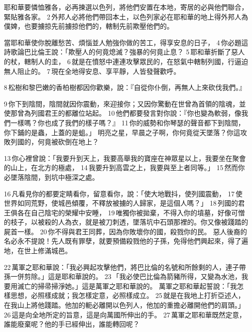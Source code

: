 耶和華要憐恤雅各，必再揀選以色列，將他們安置在本地，寄居的必與他們聯合，緊貼雅各家。 2 外邦人必將他們帶回本土，以色列家必在耶和華的地上得外邦人為僕婢，也要擄掠先前擄掠他們的，轄制先前欺壓他們的。

當耶和華使你脫離愁苦、煩惱並人勉強你做的苦工，得享安息的日子， 4 你必題這詩歌論巴比倫王說：「欺壓人的何竟熄滅？強暴的何竟止息？ 5 耶和華折斷了惡人的杖，轄制人的圭， 6 就是在憤怒中連連攻擊眾民的，在怒氣中轄制列國，行逼迫無人阻止的。 7 現在全地得安息、享平靜，人皆發聲歡呼。 

8 松樹和黎巴嫩的香柏樹都因你歡樂，說：『自從你仆倒，再無人上來砍伐我們。』 

9 你下到陰間，陰間就因你震動，來迎接你；又因你驚動在世曾為首領的陰魂，並使那曾為列國君王的都離位站起。 10 他們都要發言對你說：『你也變為軟弱，像我們一樣嗎？你也成了我們的樣子嗎？』 11 你的威勢和你琴瑟的聲音都下到陰間，你下鋪的是蟲，上蓋的是蛆。」
明亮之星，早晨之子啊，你何竟從天墜落？你這攻敗列國的，何竟被砍倒在地上？ 

13 你心裡曾說：「我要升到天上，我要高舉我的寶座在神眾星以上，我要坐在聚會的山上，在北方的極處， 14 我要升到高雲之上，我要與至上者同等。」 15 然而你必墜落陰間，到坑中極深之處。 

16 凡看見你的都要定睛看你，留意看你，說：「使大地戰抖，使列國震動， 17 使世界如同荒野，使城邑傾覆，不釋放被擄的人歸家，是這個人嗎？」 18 列國的君王俱各在自己陰宅的榮耀中安睡， 19 唯獨你被拋棄，不得入你的墳墓，好像可憎的枝子，以被殺的人為衣，就是被刀刺透，墜落坑中石頭那裡的。你又像被踐踏的屍首一樣。 20 你不得與君王同葬，因為你敗壞你的國，殺戮你的民。
惡人後裔的名必永不提說！先人既有罪孽，就要預備殺戮他的子孫，免得他們興起來，得了遍地，在世上修滿城邑。 


22 萬軍之耶和華說：「我必興起攻擊他們，將巴比倫的名號和所餘剩的人，連子帶孫一併剪除。」這是耶和華說的。 
23 「我必使巴比倫為箭豬所得，又變為水池，我要用滅亡的掃帚掃淨她。」這是萬軍之耶和華說的。
萬軍之耶和華起誓說：「我怎樣思想，必照樣成就；我怎樣定意，必照樣成立。 25 就是在我地上打折亞述人，在我山上將他踐踏。他加的軛必離開以色列人，他加的重擔必離開他們的肩頭。」 26 這是向全地所定的旨意，這是向萬國所伸出的手。 27 萬軍之耶和華既然定意，誰能廢棄呢？他的手已經伸出，誰能轉回呢？


